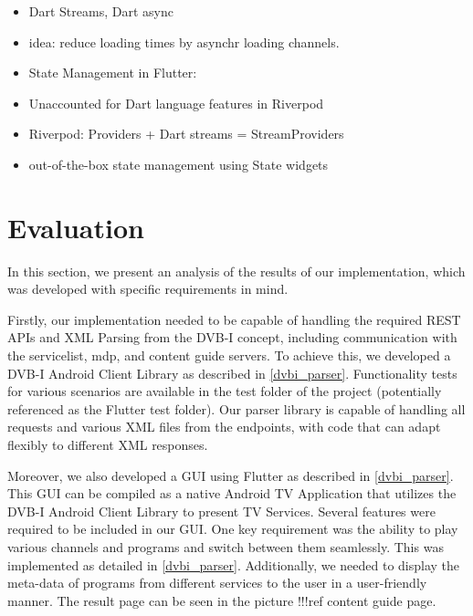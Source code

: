 \documentclass[conference]{IEEEtran}
\begin{document}
\begin{itemize}
	\item Dart Streams, Dart async
	\item idea: reduce loading times by asynchr loading channels. 
	\item State Management in Flutter: 
	\item Unaccounted for Dart language features in Riverpod
	\item Riverpod: Providers + Dart streams = StreamProviders
	\item out-of-the-box state management using State widgets
\end{itemize}	


\section{Evaluation}




In this section, we present an analysis of the results of our implementation, which was developed with specific requirements in mind.

Firstly, our implementation needed to be capable of handling the required REST APIs and XML Parsing from the DVB-I concept, including communication with the servicelist, mdp, and content guide servers. To achieve this, we developed a DVB-I Android Client Library as described in \ref{dvbi_parser}. Functionality tests for various scenarios are available in the test folder of the project (potentially referenced as the Flutter test folder). Our parser library is capable of handling all requests and various XML files from the endpoints, with code that can adapt flexibly to different XML responses.




Moreover, we also developed a GUI using Flutter as described in \ref{dvbi_parser}. This GUI can be compiled as a native Android TV Application that utilizes the DVB-I Android Client Library to present TV Services. Several features were required to be included in our GUI. One key requirement was the ability to play various channels and programs and switch between them seamlessly. This was implemented as detailed in \ref{dvbi_parser}. Additionally, we needed to display the meta-data of programs from different services to the user in a user-friendly manner.
 The result page can be seen in the picture !!!ref content guide page.
\end{document}
